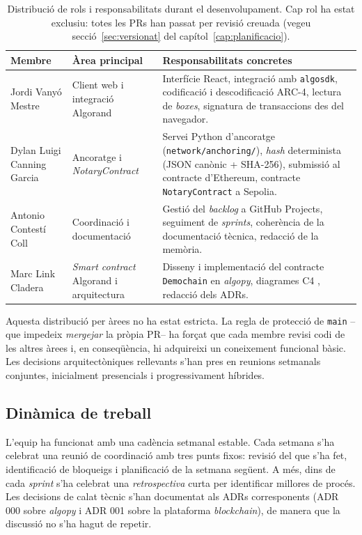 \begin{table}[ht]
\centering
\small
\begin{tabular}{@{}p{3.3cm}p{4cm}p{5cm}@{}}
\toprule
\textbf{Membre} & \textbf{Àrea principal} & \textbf{Responsabilitats concretes} \\
\midrule
Jordi Vanyó Mestre & Client web i integració Algorand & Interfície React, integració amb \texttt{algosdk}, codificació i descodificació ARC-4, lectura de \emph{boxes}, signatura de transaccions des del navegador. \\
\addlinespace
Dylan Luigi Canning Garcia & Ancoratge i \emph{NotaryContract} & Servei Python d'ancoratge (\texttt{network/anchoring/}), \emph{hash} determinista (JSON canònic + \ac{SHA}-256), submissió al contracte d'Ethereum, contracte \texttt{NotaryContract} a Sepolia. \\
\addlinespace
Antonio Contestí Coll & Coordinació i documentació & Gestió del \emph{backlog} a GitHub Projects, seguiment de \emph{sprints}, coherència de la documentació tècnica, redacció de la memòria. \\
\addlinespace
Marc Link Cladera & \emph{Smart contract} Algorand i arquitectura & Disseny i implementació del contracte \texttt{Demochain} en \emph{algopy}, diagrames C4 \cite{brown2018c4}, redacció dels \acp{ADR}. \\
\bottomrule
\end{tabular}
\caption[Rols i responsabilitats]{Distribució de rols i responsabilitats
durant el desenvolupament. Cap rol ha estat exclusiu: totes les \acsp{PR}
han passat per revisió creuada (vegeu
secció~\ref{sec:versionat} del capítol~\ref{cap:planificacio}).}
\label{tab:rols-desenv}
\end{table}

Aquesta distribució per àrees no ha estat estricta. La regla de
protecció de \texttt{main} --que impedeix \emph{mergejar} la pròpia
\ac{PR}-- ha forçat que cada membre revisi codi de les altres àrees i,
en conseqüència, hi adquireixi un coneixement funcional bàsic. Les
decisions arquitectòniques rellevants s'han pres en reunions setmanals
conjuntes, inicialment presencials i progressivament híbrides.

\subsection{Dinàmica de treball}

L'equip ha funcionat amb una cadència setmanal estable. Cada setmana
s'ha celebrat una reunió de coordinació amb tres punts fixos: revisió
del que s'ha fet, identificació de bloqueigs i planificació de la
setmana següent. A més, dins de cada \emph{sprint} s'ha celebrat una
\emph{retrospectiva} curta per identificar millores de procés. Les
decisions de calat tècnic s'han documentat als \acp{ADR} corresponents
(\ac{ADR} 000 sobre \emph{algopy} i \ac{ADR} 001 sobre la plataforma
\emph{blockchain}), de manera que la discussió no s'ha hagut de
repetir.

